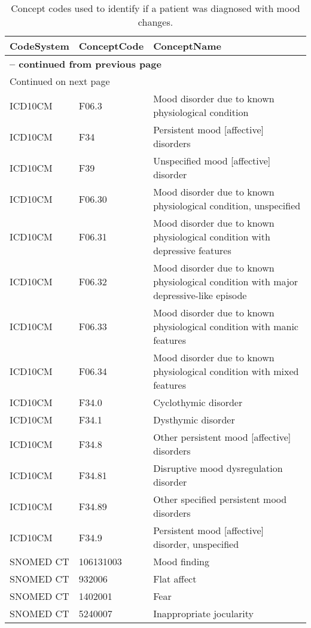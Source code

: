 \begin{longtable}{p{}p{}p{}}
\caption{Concept codes used to identify if a patient was diagnosed with mood changes.} \\ 
 CodeSystem & ConceptCode & ConceptName \\ 
  \hline 
\endfirsthead 
\multicolumn{3}{p{\textwidth}}{{ \bfseries \tablename \thetable{} -- continued from previous page}} \ 
\hline CodeSystem & ConceptCode & ConceptName \\ \hline 
\endhead 
\hline \multicolumn{3}{p{\textwidth}}{{Continued on next page}} \\ \hline 
\endfoot 
\hline 
\endlastfoot 
 \hline
ICD10CM & F06.3 & Mood disorder due to known physiological condition \\ 
  ICD10CM & F34 & Persistent mood [affective] disorders \\ 
  ICD10CM & F39 & Unspecified mood [affective] disorder \\ 
  ICD10CM & F06.30 & Mood disorder due to known physiological condition, unspecified \\ 
  ICD10CM & F06.31 & Mood disorder due to known physiological condition with depressive features \\ 
  ICD10CM & F06.32 & Mood disorder due to known physiological condition with major depressive-like episode \\ 
  ICD10CM & F06.33 & Mood disorder due to known physiological condition with manic features \\ 
  ICD10CM & F06.34 & Mood disorder due to known physiological condition with mixed features \\ 
  ICD10CM & F34.0 & Cyclothymic disorder \\ 
  ICD10CM & F34.1 & Dysthymic disorder \\ 
  ICD10CM & F34.8 & Other persistent mood [affective] disorders \\ 
  ICD10CM & F34.81 & Disruptive mood dysregulation disorder \\ 
  ICD10CM & F34.89 & Other specified persistent mood disorders \\ 
  ICD10CM & F34.9 & Persistent mood [affective] disorder, unspecified \\ 
  SNOMED CT & 106131003 & Mood finding \\ 
  SNOMED CT & 932006 & Flat affect \\ 
  SNOMED CT & 1402001 & Fear \\ 
  SNOMED CT & 5240007 & Inappropriate jocularity \\ 

\end{longtable}
